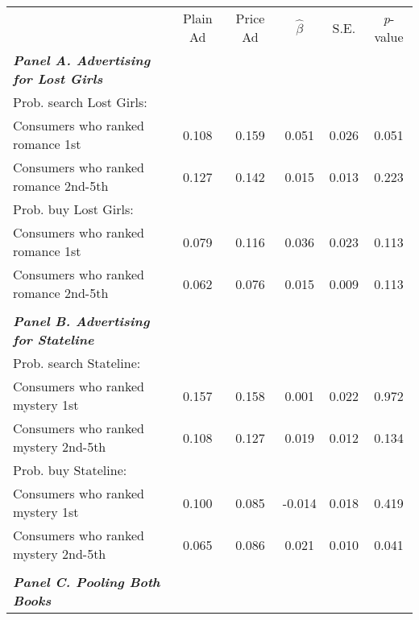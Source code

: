 \begin{center}
\begin{tabular}{lccccc}
\hline \noalign{\smallskip} & Plain Ad & Price Ad & $\hat{\beta}$ & S.E. & \emph{p}-value\\
\noalign{\smallskip}\hline \noalign{\smallskip}\textbf{\emph{Panel A. Advertising for Lost Girls}} &  &  &  &  & \\
\hspace{5pt} Prob. search Lost Girls: &  &  &  &  & \\
\hspace{5pt} Consumers who ranked romance 1st & 0.108 & 0.159 & 0.051 & 0.026 & 0.051\\
\hspace{5pt} Consumers who ranked romance 2nd-5th & 0.127 & 0.142 & 0.015 & 0.013 & 0.223\\
\hspace{5pt} Prob. buy Lost Girls: &  &  &  &  & \\
\hspace{5pt} Consumers who ranked romance 1st & 0.079 & 0.116 & 0.036 & 0.023 & 0.113\\
\hspace{5pt} Consumers who ranked romance 2nd-5th & 0.062 & 0.076 & 0.015 & 0.009 & 0.113\\
  &  &  &  &  & \\
\textbf{\emph{Panel B. Advertising for Stateline}} &  &  &  &  & \\
\hspace{5pt} Prob. search Stateline: &  &  &  &  & \\
\hspace{5pt} Consumers who ranked mystery 1st & 0.157 & 0.158 & 0.001 & 0.022 & 0.972\\
\hspace{5pt} Consumers who ranked mystery 2nd-5th & 0.108 & 0.127 & 0.019 & 0.012 & 0.134\\
\hspace{5pt} Prob. buy Stateline: &  &  &  &  & \\
\hspace{5pt} Consumers who ranked mystery 1st & 0.100 & 0.085 & -0.014 & 0.018 & 0.419\\
\hspace{5pt} Consumers who ranked mystery 2nd-5th & 0.065 & 0.086 & 0.021 & 0.010 & 0.041\\
  &  &  &  &  & \\
\textbf{\emph{Panel C. Pooling Both Books}} &  &  &  &  & \\

\end{tabular}
\end{center}
